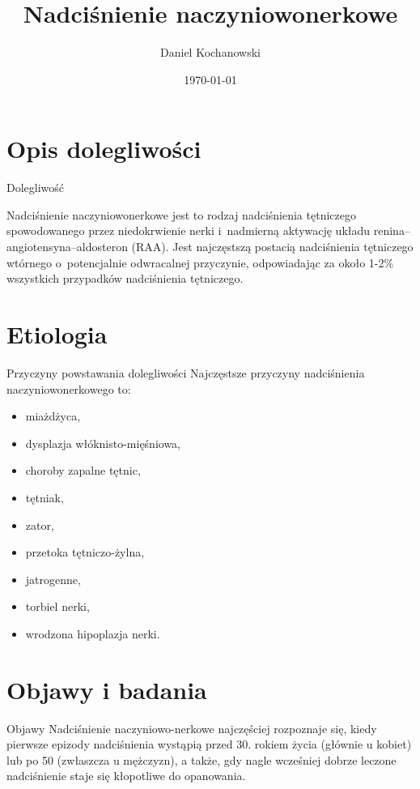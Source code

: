 \documentclass[]{beamer}
\title{Nadciśnienie naczyniowonerkowe}
\author{Daniel Kochanowski}
\institute{UWM}
\date{\today}
\begin{document}
\frame
{
\maketitle
}
\section{Opis dolegliwości}
\begin{frame}{Dolegliwość}

Nadciśnienie naczyniowonerkowe jest to rodzaj nadciśnienia tętniczego spowodowanego przez niedokrwienie nerki i~nadmierną aktywację układu renina–angiotensyna–aldosteron (RAA). Jest najczęstszą postacią nadciśnienia tętniczego wtórnego o~potencjalnie odwracalnej przyczynie, odpowiadając za około 1-2\% wszystkich przypadków nadciśnienia tętniczego.~\cite{1}
\end{frame}


\section{Etiologia}
\begin{frame}{Przyczyny powstawania dolegliwości}
Najczęstsze przyczyny nadciśnienia naczyniowonerkowego to:
\begin{itemize}
\item<2-10> miażdżyca,
\item<3-10> dysplazja włóknisto-mięśniowa,
\item<4-10> choroby zapalne tętnic,
\item<5-10> tętniak,
\item<6-10> zator,
\item<7-10> przetoka tętniczo-żylna,
\item<8-10> jatrogenne,
\item<9-10> torbiel nerki,
\item<10> wrodzona hipoplazja nerki.
\end{itemize}
\end{frame}


\section{Objawy i badania}
\begin{frame}{Objawy}
Nadciśnienie naczyniowo-nerkowe najczęściej rozpoznaje się, kiedy pierwsze epizody nadciśnienia wystąpią przed 30. rokiem życia (głównie u kobiet) lub po 50 (zwłaszcza u mężczyzn), a także, gdy nagle wcześniej dobrze leczone nadciśnienie staje się kłopotliwe do opanowania.
\end{frame}
\end{document}
